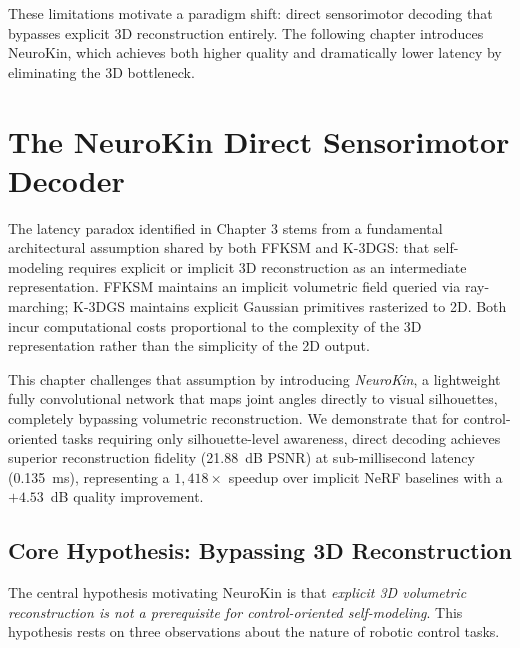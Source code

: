 \documentclass[12pt,a4paper,oneside]{report}
\begin{document}
These limitations motivate a paradigm shift: direct sensorimotor decoding that bypasses explicit 3D reconstruction entirely. The following chapter introduces NeuroKin, which achieves both higher quality and dramatically lower latency by eliminating the 3D bottleneck.

\clearpage

\chapter{The NeuroKin Direct Sensorimotor Decoder}
\label{chap:neurokin_decoder}

The latency paradox identified in Chapter 3 stems from a fundamental architectural assumption shared by both FFKSM and K-3DGS: that self-modeling requires explicit or implicit 3D reconstruction as an intermediate representation. FFKSM maintains an implicit volumetric field queried via ray-marching; K-3DGS maintains explicit Gaussian primitives rasterized to 2D. Both incur computational costs proportional to the complexity of the 3D representation rather than the simplicity of the 2D output.

This chapter challenges that assumption by introducing \textit{NeuroKin}, a lightweight fully convolutional network that maps joint angles directly to visual silhouettes, completely bypassing volumetric reconstruction. We demonstrate that for control-oriented tasks requiring only silhouette-level awareness, direct decoding achieves superior reconstruction fidelity (21.88~dB PSNR) at sub-millisecond latency (0.135~ms), representing a $1,418\times$ speedup over implicit NeRF baselines with a $+4.53$~dB quality improvement.

\section{Core Hypothesis: Bypassing 3D Reconstruction}
\label{sec:core_hypothesis_decoder}

The central hypothesis motivating NeuroKin is that \textit{explicit 3D volumetric reconstruction is not a prerequisite for control-oriented self-modeling}. This hypothesis rests on three observations about the nature of robotic control tasks.
\end{document}
